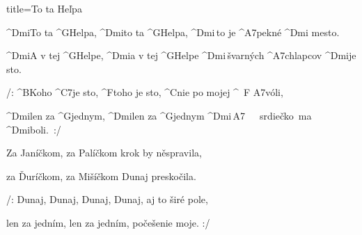 \begin{song}{title=\predtitle\centering To ta He\v lpa \\\large  \vspace*{-0.3cm}}  %
\begin{centerjustified}
\nejnejvetsi

\sloka 
	^{Dmi}To ta ^{G\z}Helpa, ^{Dmi}to ta ^{G\z}Helpa, ^{Dmi\,}to je ^{A7\z}pekné ^{Dmi\,\,}mesto.

	^{Dmi}A v tej ^{G\z}Helpe, ^{Dmi}a v tej ^{G\z}Helpe ^{Dmi\,\z}švarných ^{A7\z}chlapcov ^{Dmi}je sto.

	/: ^{B\z}Koho ^{C7}je sto, ^{F\z}toho je sto, ^{C}nie po mojej ^{\,\,\,F\,\,A7}vóli,

	^{Dmi}len za ^{G\z}jednym, ^{Dmi}len za ^{G\z}jednym ^{Dmi\,A7{\z}}~~~srdiečko~ma ^{Dmi\z}boli.~:/


\sloka
	Za Janíčkom, za Palíčkom krok by něspravila,
	
	za Ďuríčkom, za Mišíčkom Dunaj preskočila.

	/: Dunaj, Dunaj, Dunaj, Dunaj, aj to širé pole,
	
	len za jedním, len za jedním, počešenie moje. :/

\end{centerjustified}
\setcounter{Slokočet}{0}
\end{song}
